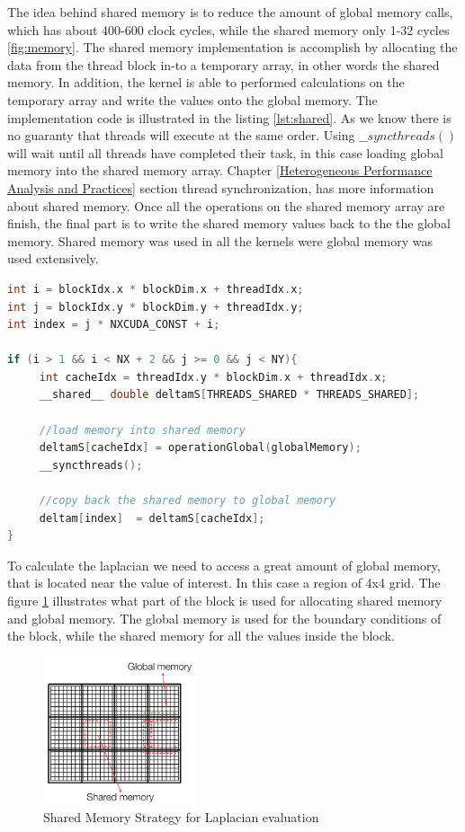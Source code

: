 The idea behind shared memory is to reduce the amount of global memory calls, which has about 400-600 clock cycles, while the shared memory only 1-32 cycles \ref{fig:memory}. The shared memory implementation is accomplish by allocating the data from the thread block in-to a temporary array, in other words the shared memory. In addition, the kernel is able to performed calculations on the temporary array and write the values onto the global memory. The implementation code is illustrated in the listing \ref{lst:shared}. As we know there is no guaranty that threads will execute at the same order. Using $\_\_syncthreads()$ will wait until all threads have completed their task, in this case loading global memory into the shared memory array. Chapter \ref{Heterogeneous Performance Analysis and Practices} section thread synchronization, has more information about shared memory. Once all the operations on the shared memory array are finish, the final part is to write the shared memory values back to the the global memory. Shared memory was used in all the kernels were global memory was used extensively. 

\begin{lstlisting}[language=C++, label={lst:shared}, caption={Shared memory}]
int i = blockIdx.x * blockDim.x + threadIdx.x;
int j = blockIdx.y * blockDim.y + threadIdx.y;
int index = j * NXCUDA_CONST + i;

if (i > 1 && i < NX + 2 && j >= 0 && j < NY){
     int cacheIdx = threadIdx.y * blockDim.x + threadIdx.x;
     __shared__ double deltamS[THREADS_SHARED * THREADS_SHARED];

	 //load memory into shared memory
     deltamS[cacheIdx] = operationGlobal(globalMemory);
     __syncthreads();

	 //copy back the shared memory to global memory
     deltam[index]  = deltamS[cacheIdx];
}
\end{lstlisting}

To calculate the laplacian we need to access a great amount of global memory, that is located near the value of interest. In this case a region of 4x4 grid. The figure \ref{fig:shared} illustrates what part of the block is used for allocating shared memory and global memory. The global memory is used for the boundary conditions of the block, while the shared memory for all the values inside the block.

\begin{figure}[htbp]
	\centering
		\includegraphics[width=0.4\textwidth]{Figures/shared.png}
		\smallskip
	\caption[Shared Memory Strategy]{Shared Memory Strategy for Laplacian evaluation }
	\label{fig:shared}
\end{figure}

